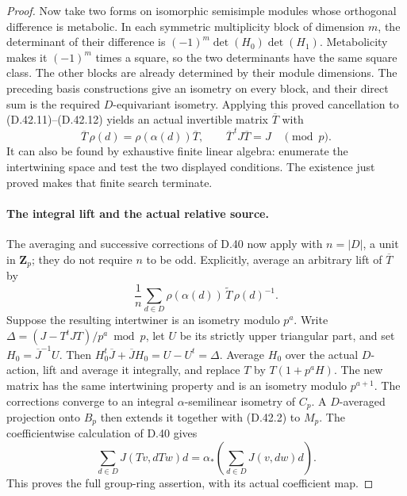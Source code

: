 \begin{proof}
Now take two forms on isomorphic semisimple
modules whose orthogonal difference is metabolic.
In each symmetric multiplicity block of
dimension \(m\), the determinant of their
difference is
\((-1)^m\det(H_0)\det(H_1)\).
Metabolicity makes it \((-1)^m\) times a square,
so the two determinants have the same square
class.
The other blocks are already determined by
their module dimensions.
The preceding basis constructions give an
isometry on every block, and their direct
sum is the required \(D\)-equivariant isometry.
Applying this proved cancellation to
\textup{(D.42.11)--(D.42.12)} yields an actual
invertible matrix \(\overline T\) with
\[
 \overline T\,\rho(d)=\rho(\alpha(d))\overline T,
       \qquad
 \overline T^{\,t}J\overline T=J
                    \quad\pmod p .
 \tag{D.42.13}
\]
It can also be found by exhaustive finite
linear algebra: enumerate the intertwining
space and test the two displayed conditions.
The existence just proved makes that finite
search terminate.

\paragraph{The integral lift and the actual relative source.}
The averaging and successive corrections of
D.40 now apply with \(n=|D|\), a unit in
\(\mathbf Z_p\); they do not require \(n\)
to be odd.
Explicitly, average an arbitrary lift of
\(\overline T\) by
\[
        \frac1n\sum_{d\in D}
        \rho(\alpha(d))\,\widetilde T\,\rho(d)^{-1}.
 \tag{D.42.14}
\]
Suppose the resulting intertwiner is an
isometry modulo \(p^a\).
Write \(\Delta=(J-T^tJT)/p^a\bmod p\),
let \(U\) be its strictly upper triangular
part, and set \(H_0=\overline J^{-1}U\).
Then \(H_0^t\overline J+\overline JH_0
=U-U^t=\Delta\).
Average \(H_0\) over the actual \(D\)-action,
lift and average it integrally, and replace
\(T\) by \(T(1+p^aH)\).
The new matrix has the same intertwining
property and is an isometry modulo \(p^{a+1}\).
The corrections converge to an integral
\(\alpha\)-semilinear isometry of \(C_p\).
A \(D\)-averaged projection onto \(B_p\)
then extends it together with
\textup{(D.42.2)} to \(M_p\).
The coefficientwise calculation of D.40 gives
\[
 \sum_{d\in D}J(Tv,dTw)d
       =\alpha_*\!\left(\sum_{d\in D}J(v,dw)d\right).
 \tag{D.42.15}
\]
This proves the full group-ring assertion,
with its actual coefficient map.


\end{proof}
